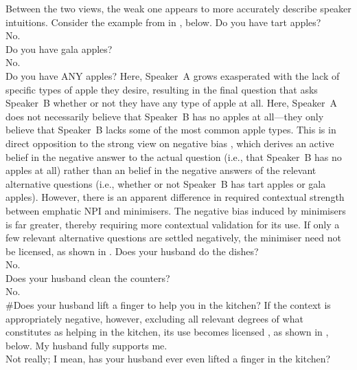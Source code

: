 Between the two views, the weak one appears to more accurately describe speaker intuitions. Consider the example from \textcite{Jeong2021} in , below.
\ex\label{ex:fruitstand}
Do you have tart apples?\\
No.\\
Do you have gala apples?\\
No.\\
Do you have ANY apples?\hfill\parencite[p.~4]{Jeong2021}
\xe
Here, Speaker~A grows exasperated with the lack of specific types of apple they desire, resulting in the final question that asks Speaker~B whether or not they have any type of apple at all. Here, Speaker~A does not necessarily believe that Speaker~B has no apples at all---they only believe that Speaker~B lacks some of the most common apple types. This is in direct opposition to the strong view on negative bias \parencite[see][]{Jeong2020}, which derives an active belief in the negative answer to the actual question (i.e., that Speaker~B has no apples at all) rather than an belief in the negative answers of the relevant alternative questions (i.e., whether or not Speaker~B has tart apples or gala apples). However, there is an apparent difference in required contextual strength between emphatic NPI and minimisers. The negative bias induced by minimisers is far greater, thereby requiring more contextual validation for its use. If only a few relevant alternative questions are settled negatively, the minimiser need not be licensed, as shown in .
\ex\label{ex:badminimiserQ}
\phantom{\#}Does your husband do the dishes?\\
\phantom{\#}No.\\
\phantom{\#}Does your husband clean the counters?\\
\phantom{\#}No.\\
\#Does your husband lift a finger to help you in the kitchen?
\xe
If the context is appropriately negative, however, excluding all relevant degrees of what constitutes as helping in the kitchen, its use becomes licensed \parencite{vanRooij2003,Jeong2021,Jeong2022}, as shown in , below.
\ex\label{ex:goodminimiserQ}
My husband fully supports me.\\
Not really; I mean, has your husband ever even lifted a finger in the kitchen?
\xe

